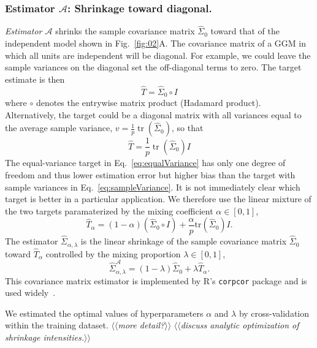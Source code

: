 \documentclass[10pt]{article}
\newcommand{\Kcomment}[1]{{\color{blue}{[KJ: #1]}}}
\DeclareMathOperator{\Tr}{tr}
\newcommand{\TODO}[1]{\emph{\small\color{blue}$\langle\langle$#1$\rangle\rangle$}}
\begin{document}
\subsubsection*{Estimator $\mathcal A$: Shrinkage toward diagonal.}
\emph{Estimator $\mathcal A$} shrinks the sample covariance matrix $\hat\Sigma_0$ toward that of the independent model shown in Fig.~\ref{fig:02}A.  The covariance matrix of a GGM in which all units are independent will be diagonal.  
For example, we  could leave the sample variances on the diagonal set the off-diagonal terms to zero. The target estimate
is then 
\begin{equation}\label{eq:sampleVariance}
\hat T= \hat\Sigma_0\circ I
\end{equation}
where $\circ$ denotes the entrywise matrix product (Hadamard product). 
Alternatively, the target could be a diagonal matrix with all variances equal to the average sample variance, $v = \frac 1 p \Tr(\hat\Sigma_0)$, so that
\begin{equation}\label{eq:equalVariance}
\hat T=\frac 1 p \Tr(\hat\Sigma_0) I
\end{equation}
The equal-variance target in Eq.~\ref{eq:equalVariance} has only one degree of freedom and thus lower estimation error but higher bias than the target with sample variances in Eq.~\ref{eq:sampleVariance}. It is not immediately clear which target is better in a particular application. We therefore use the linear mixture of the two targets paramaterized by the mixing coefficient $\alpha\in[0,1]$,
\begin{equation}
\hat T_\alpha = (1-\alpha)(\hat\Sigma_0 \circ I) + \frac \alpha p \mbox{tr}(\hat \Sigma_0)I.
\end{equation}
The estimator $\hat\Sigma_{\alpha,\lambda}$ is the linear shrinkage of the sample covariance matrix $\hat\Sigma_0$ toward $\hat T_\alpha$ controlled by the mixing proportion $\lambda\in[0,1]$,
\begin{equation}
\hat\Sigma_{\alpha,\lambda}^\mathcal{A} = (1-\lambda)\hat\Sigma_0 + \lambda\hat T_\alpha.
\end{equation}
This covariance matrix estimator is implemented by R's {\tt corpcor} package \cite{Schaefer:2010} and is used widely~\cite{Schafer:2005}.

We estimated the optimal values of hyperparameters $ \alpha$ and $ \lambda$  by  cross-validation within the training dataset. \TODO{more detail?} \TODO{discuss analytic optimization of shrinkage intensities.}

\Kcomment{Yes -- you give no details about the cross-validation.  You should provide some details at least in 
one case, or have a separate section that discusses how you implemented it.}
\end{document}
